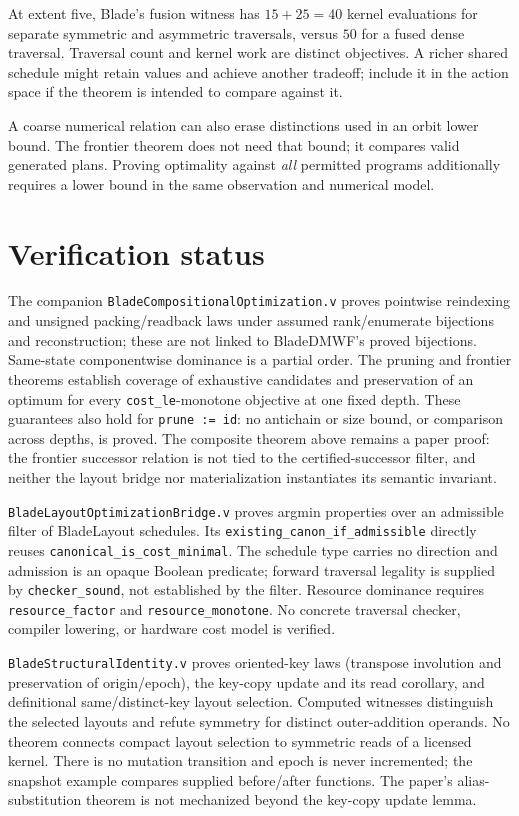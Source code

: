 \documentclass[11pt]{article}
\begin{document}
At extent five, Blade's fusion witness has $15+25=40$ kernel evaluations for separate symmetric and asymmetric traversals, versus $50$ for a fused dense traversal. Traversal count and kernel work are distinct objectives. A richer shared schedule might retain values and achieve another tradeoff; include it in the action space if the theorem is intended to compare against it.

A coarse numerical relation can also erase distinctions used in an orbit lower bound. The frontier theorem does not need that bound; it compares valid generated plans. Proving optimality against \emph{all} permitted programs additionally requires a lower bound in the same observation and numerical model.

\section{Verification status}
The companion \texttt{BladeCompositionalOptimization.v} proves pointwise reindexing and unsigned packing/readback laws under assumed rank/enumerate bijections and reconstruction; these are not linked to BladeDMWF's proved bijections. Same-state componentwise dominance is a partial order. The pruning and frontier theorems establish coverage of exhaustive candidates and preservation of an optimum for every \texttt{cost\_le}-monotone objective at one fixed depth. These guarantees also hold for \texttt{prune := id}: no antichain or size bound, or comparison across depths, is proved. The composite theorem above remains a paper proof: the frontier successor relation is not tied to the certified-successor filter, and neither the layout bridge nor materialization instantiates its semantic invariant.

\texttt{BladeLayoutOptimizationBridge.v} proves argmin properties over an admissible filter of BladeLayout schedules. Its \texttt{existing\_canon\_if\_admissible} directly reuses \texttt{canonical\_is\_cost\_minimal}. The schedule type carries no direction and admission is an opaque Boolean predicate; forward traversal legality is supplied by \texttt{checker\_sound}, not established by the filter. Resource dominance requires \texttt{resource\_factor} and \texttt{resource\_monotone}. No concrete traversal checker, compiler lowering, or hardware cost model is verified.

\texttt{BladeStructuralIdentity.v} proves oriented-key laws (transpose involution and preservation of origin/epoch), the key-copy update and its read corollary, and definitional same/distinct-key layout selection. Computed witnesses distinguish the selected layouts and refute symmetry for distinct outer-addition operands. No theorem connects compact layout selection to symmetric reads of a licensed kernel. There is no mutation transition and epoch is never incremented; the snapshot example compares supplied before/after functions. The paper's alias-substitution theorem is not mechanized beyond the key-copy update lemma.
\end{document}
